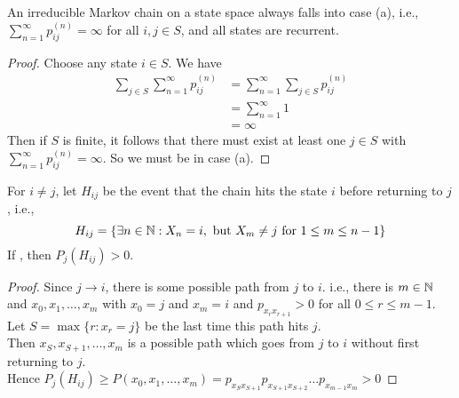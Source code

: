 \documentclass[11pt]{article}
\newcommand{\dur}[3]{{#1}_{#2}^{({#3})}}
\begin{document}
     An irreducible Markov chain on a  state space always falls into case (a), i.e., $\sum_{n=1}^\infty p_{ij}^{(n)} = \infty$ for all $i, j \in S$, and all states are recurrent.
    \begin{proof}
    	Choose any state $i \in S$. We have
    	\begin{align*}
    		\sum_{j \in S}\sum_{n=1}^\infty \dur{p}{ij}{n} &= \sum_{n=1}^\infty\sum_{j \in S} \dur{p}{ij}{n} \tag{exchanging the sums} \\
    		& = \sum_{n=1}^\infty 1 \\
    		&= \infty
    	\end{align*}
    	Then if $S$ is finite, it follows that there must exist at least one $j \in S$ with $\sum_{n=1}^\infty p_{ij}^{(n)} = \infty$. So we must be in case (a).
    	
    \end{proof}
    \notation
    For $i \neq j$, let $H_{ij}$ be the event that the chain hits the state $i$ before returning to $j$, i.e.,
    $$H_{ij} = \{ \exists n \in \mathbb{N}: X_n = i, \text{ but } X_m \neq j \text{ for } 1 \leq m \leq n - 1\}$$
     If , then $P_j(H_{ij}) > 0$.
    
    \begin{proof}
    	Since $j \rightarrow i$, there is some possible path from $j$ to $i$. i.e., there is $m \in \mathbb{N}$ and $x_0, x_1, \hdots, x_m$ with $x_0 = j$ and $x_m = i$ and $p_{x_rx_{r+1}} > 0$ for all $0 \leq r \leq m - 1$. \\
    	Let $S = \max\{r: x_r = j\}$ be the last time this path hits $j$. \\
    	Then $x_S, x_{S+1}, \hdots, x_m$ is a possible path which goes from $j$ to $i$ without first returning to $j$. \\
    	Hence $P_j(H_{ij}) \geq P(x_0, x_1, \hdots, x_m) = p_{x_Sx_{S+1}}p_{x_{S+1}x_{S+2}}\hdots p_{x_{m-1}x_m} > 0$
    	
    	
    \end{proof}
  
\end{document}
